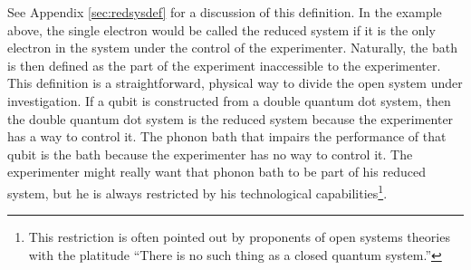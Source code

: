 See Appendix \ref{sec:redsysdef} for a discussion of this definition.  In the example above, the single electron would be called the reduced system if it is the only electron in the system under the control of the experimenter.  Naturally, the bath is then defined as the part of the experiment inaccessible to the experimenter.  This definition is a straightforward, physical way to divide the open system under investigation.  If a qubit is constructed from a double quantum dot system, then the double quantum dot system is the reduced system because the experimenter has a way to control it.  The phonon bath that impairs the performance of that qubit is the bath because the experimenter has no way to control it.  The experimenter might really want that phonon bath to be part of his reduced system, but he is always restricted by his technological capabilities\footnote{This restriction is often pointed out by proponents of open systems theories with the platitude ``There is no such thing as a closed quantum system.''}.

